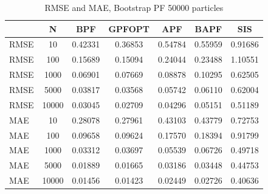 \documentclass[
]{book}
\theoremstyle{break}
\theoremstyle{nonumberplain}
\begin{document}
\begin{longtable}[t]{lcccccc}
\caption{\label{tab:unnamed-chunk-42}RMSE and MAE, Bootstrap PF 50000 particles}\\
\toprule
  & N & BPF & GPFOPT & APF & BAPF & SIS\\
\midrule
RMSE & 10 & 0.42331 & 0.36853 & 0.54784 & 0.55959 & 0.91686\\
RMSE & 100 & 0.15689 & 0.15094 & 0.24044 & 0.23488 & 1.10551\\
RMSE & 1000 & 0.06901 & 0.07669 & 0.08878 & 0.10295 & 0.62505\\
RMSE & 5000 & 0.03817 & 0.03568 & 0.05742 & 0.06110 & 0.62004\\
RMSE & 10000 & 0.03045 & 0.02709 & 0.04296 & 0.05151 & 0.51189\\
\addlinespace
MAE & 10 & 0.28078 & 0.27961 & 0.43103 & 0.43779 & 0.72753\\
MAE & 100 & 0.09658 & 0.09624 & 0.17570 & 0.18394 & 0.91799\\
MAE & 1000 & 0.03312 & 0.03697 & 0.05539 & 0.06726 & 0.49718\\
MAE & 5000 & 0.01889 & 0.01665 & 0.03186 & 0.03448 & 0.44753\\
MAE & 10000 & 0.01456 & 0.01423 & 0.02449 & 0.02726 & 0.40636\\
\bottomrule
\end{longtable}
\end{document}
